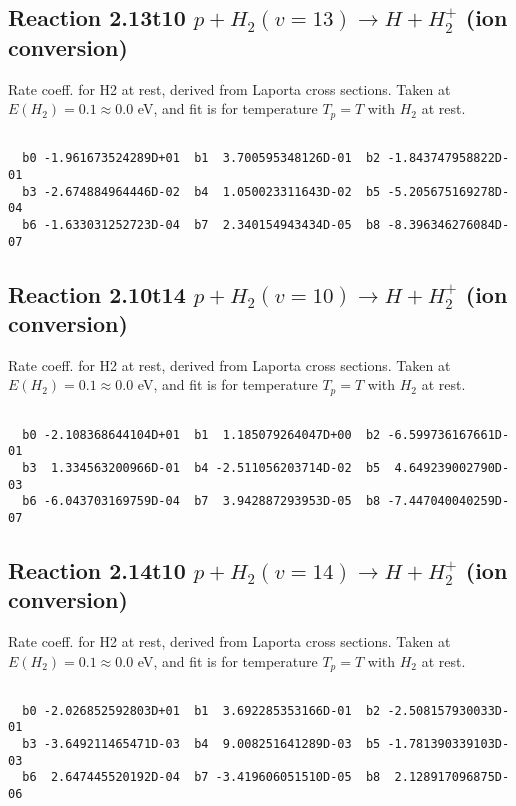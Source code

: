 \documentclass[12pt,dvipdfmx]{article}
\begin{document}
\newpage
\subsection{
Reaction 2.13t10
$ p + H_2(v=13) \rightarrow H + H_2^+$ (ion conversion)
}
Rate coeff. for H2 at rest, derived from Laporta cross sections.
Taken at $E(H_2) = 0.1 \approx 0.0$ eV,  and fit is for temperature $T_p=T$ with $H_2$ at rest.

\begin{small}\begin{verbatim}

  b0 -1.961673524289D+01  b1  3.700595348126D-01  b2 -1.843747958822D-01
  b3 -2.674884964446D-02  b4  1.050023311643D-02  b5 -5.205675169278D-04
  b6 -1.633031252723D-04  b7  2.340154943434D-05  b8 -8.396346276084D-07

\end{verbatim}\end{small}

\newpage
\subsection{
Reaction 2.10t14
$ p + H_2(v=10) \rightarrow H + H_2^+$ (ion conversion)
}
Rate coeff. for H2 at rest, derived from Laporta cross sections.
Taken at $E(H_2) = 0.1 \approx 0.0$ eV,  and fit is for temperature $T_p=T$ with $H_2$ at rest.

\begin{small}\begin{verbatim}

  b0 -2.108368644104D+01  b1  1.185079264047D+00  b2 -6.599736167661D-01
  b3  1.334563200966D-01  b4 -2.511056203714D-02  b5  4.649239002790D-03
  b6 -6.043703169759D-04  b7  3.942887293953D-05  b8 -7.447040040259D-07

\end{verbatim}\end{small}

\newpage
\subsection{
Reaction 2.14t10
$ p + H_2(v=14) \rightarrow H + H_2^+$ (ion conversion)
}
Rate coeff. for H2 at rest, derived from Laporta cross sections.
Taken at $E(H_2) = 0.1 \approx 0.0$ eV,  and fit is for temperature $T_p=T$ with $H_2$ at rest.

\begin{small}\begin{verbatim}

  b0 -2.026852592803D+01  b1  3.692285353166D-01  b2 -2.508157930033D-01
  b3 -3.649211465471D-03  b4  9.008251641289D-03  b5 -1.781390339103D-03
  b6  2.647445520192D-04  b7 -3.419606051510D-05  b8  2.128917096875D-06

\end{verbatim}\end{small}
\end{document}
